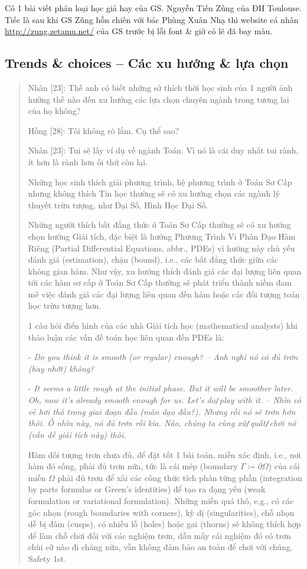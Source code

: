 \documentclass[12pt]{article}
\begin{document}
Có 1 bài viết phân loại học giả hay của GS. Nguyễn Tiến Zũng của ĐH Toulouse. Tiếc là sau khi GS Zũng hỗn chiến với bác  Phùng Xuân Nhạ thì website cá nhân \url{http://zung.zetamu.net/} của GS trước bị lỗi font \& giờ có lẽ đã bay màu.

\subsection{Trends \& choices -- Các xu hướng \& lựa chọn}	

\begin{quote}
	{\sf Nhân [23]}: Thế anh có biết những sở thích thời học sinh của 1 người ảnh hưởng thế nào đến xu hướng các lựa chọn chuyên ngành trong tương lai của họ không?
	
	{\sf Hồng [28]}: Tôi không rõ lắm. Cụ thể sao?
	
	{\sf Nhân [23]}: Tui sẽ lấy ví dụ về ngành Toán. Vì nó là cái duy nhất tui rành, ít hơn là rành hơn ối thứ còn lại.
	
	Những học sinh thích giải phương trình, hệ phương trình ở Toán Sơ Cấp nhưng không thích Tin học thường sẽ có xu hướng chọn các ngành lý thuyết trừu tượng, như Đại Số, Hình Học Đại Số. 
	
	Những người thích bất đẳng thức ở Toán Sơ Cấp thường sẽ có xu hướng chọn hướng Giải tích, đặc biệt là hướng Phương Trình Vi Phân Đạo Hàm Riêng (Partial Differential Equations, abbr., PDEs) vì hướng này chủ yếu đánh giá (estimation), chặn (bound), i.e., các bất đẳng thức giữa các không gian hàm. Như vậy, xu hướng thích đánh giá các đại lượng liên quan tới các hàm sơ cấp ở Toán Sơ Cấp thường sẽ phát triển thành niềm đam mê việc đánh giá các đại lượng liên quan đến hàm hoặc các đối tượng toán học trừu tượng hơn.

	1 câu hỏi điển hình của các nhà Giải tích học (mathematical analysts) khi thảo luận các vấn đề toán học liên quan đến PDEs là:
	
	- {\it Do you think it is smooth (or regular) enough? -- Anh nghĩ nó có đủ trơn (hay nhớt) không?}
	
	- {\it It seems a little rough at the initial phase. But it will be smoother later. Oh, now it's already smooth enough for us. Let's do{\tt/}play with it. -- Nhìn có vẻ hơi thô trong giai đoạn đầu (màn dạo đầu?). Nhưng rồi nó sẽ trơn hơn thôi. Ồ nhìn này, nó đủ trơn rồi kìa. Nào, chúng ta cùng xử{\tt/}quất{\tt/}chơi nó (vấn đề giải tích này) thôi}.
	
	Hàm đối tượng trơn chưa đủ, để đặt tốt 1 bài toán, miền xác định, i.e., nơi hàm đó sống, phải đủ trơn nữa, tức là cái mép (boundary $\Gamma\coloneqq\partial\Omega$) của cái miền $\Omega$ phải đủ trơn để xài các công thức tích phân từng phần (integration by parts formulas or Green's identities) để tạo ra dạng yếu (weak formulation or variational formulation). Những miền quá thô, e.g., có các góc nhọn (rough boundaries with corners), kỳ dị (singularities), chỗ nhọn dễ bị đâm (cusps), có nhiều lỗ (holes) hoặc gai (thorns) sẽ không thích hợp để làm chỗ chơi đối với các nghiệm trơn, dẫu mấy cái nghiệm đó có trơn chùi cỡ nào đi chăng nữa, vẫn không đảm bảo an toàn để chơi với chúng. Safety 1st.
	

\end{quote}
\end{document}
